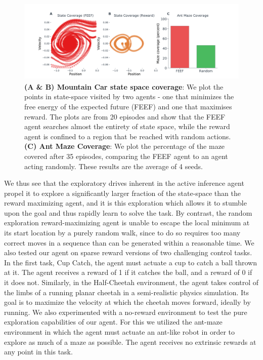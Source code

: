 \begin{figure}[h]
   \label{fig:b}
   \centering 
   \includegraphics[width=12cm, height=4cm]{chapter_4_figures/RLAI_figure_two.pdf}
\caption{\textbf{(A \& B) Mountain Car state space coverage}: We plot the points in state-space visited by two agents - one that minimizes the free energy of the expected future (FEEF) and one that maximises reward. The plots are from 20 episodes and show that the FEEF agent searches almost the entirety of state space, while the reward agent is confined to a region that be reached with random actions. \textbf{(C) Ant Maze Coverage}: We plot the percentage of the maze covered after 35 episodes, comparing the FEEF agent to an agent acting randomly. These results are the average of 4 seeds.}
\end{figure}


We thus see that the exploratory drives inherent in the active inference agent propel it to explore a significantly larger fraction of the state-space than the reward maximizing agent, and it is this exploration which allows it to stumble upon the goal and thus rapidly learn to solve the task. By contrast, the random exploration reward-maximizing agent is unable to escape the local minimum at its start location by a purely random walk, since to do so requires too many correct moves in a sequence than can be generated within a reasonable time.
We also tested our agent on sparse reward versions of two challenging control tasks. In the first task, Cup Catch, the agent must actuate a cup to catch a ball thrown at it. The agent receives a reward of 1 if it catches the ball, and a reward of 0 if it does not. Similarly, in the Half-Cheetah environment, the agent takes control of the limbs of a running planar cheetah in a semi-realistic physics simulation. Its goal is to maximize the velocity at which the cheetah moves forward, ideally by running. We also experimented with a no-reward environment to test the pure exploration capabilities of our agent. For this we utilized the ant-maze environment in which the agent must actuate an ant-like robot in order to explore as much of a maze as possible. The agent receives no extrinsic rewards at any point in this task.

